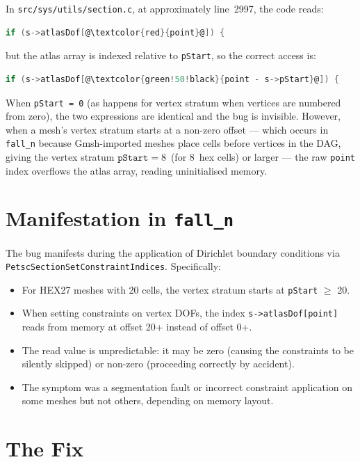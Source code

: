In \texttt{src/sys/utils/section.c}, at approximately line~2997, the code reads:
\begin{lstlisting}[language=C,escapechar=@]
if (s->atlasDof[@\textcolor{red}{point}@]) {
\end{lstlisting}
but the atlas array is indexed relative to \texttt{pStart}, so the correct
access is:
\begin{lstlisting}[language=C,escapechar=@]
if (s->atlasDof[@\textcolor{green!50!black}{point - s->pStart}@]) {
\end{lstlisting}

When \texttt{pStart = 0} (as happens for vertex stratum when vertices are
numbered from zero), the two expressions are identical and the bug is
invisible.  However, when a mesh's vertex stratum starts at a non-zero offset
--- which occurs in \texttt{fall\_n} because Gmsh-imported meshes place cells
before vertices in the DAG, giving the vertex stratum
$\texttt{pStart} = 8$~(for 8~hex cells) or larger --- the raw \texttt{point}
index overflows the atlas array, reading uninitialised memory.


\section{Manifestation in \texttt{fall\_n}}
\label{sec:manifestation}

The bug manifests during the application of Dirichlet boundary conditions
via \texttt{PetscSectionSetConstraintIndices}.  Specifically:
\begin{itemize}[nosep]
  \item For HEX27 meshes with 20 cells, the vertex stratum starts at
        \texttt{pStart} $\ge$ 20.
  \item When setting constraints on vertex DOFs, the index
        \texttt{s->atlasDof[point]} reads from memory at offset 20+
        instead of offset 0+.
  \item The read value is unpredictable: it may be zero (causing the
        constraints to be silently skipped) or non-zero (proceeding correctly
        by accident).
  \item The symptom was a segmentation fault or incorrect constraint
        application on some meshes but not others, depending on memory layout.
\end{itemize}


\section{The Fix}
\label{sec:the_fix}

